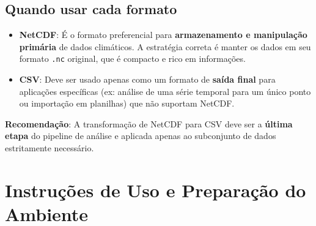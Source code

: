 \documentclass[12pt, a4paper]{article}
\begin{document}
\subsection*{Quando usar cada formato}
\begin{itemize}
    \item \textbf{NetCDF}: É o formato preferencial para \textbf{armazenamento e manipulação primária} de dados climáticos. A estratégia correta é manter os dados em seu formato \texttt{.nc} original, que é compacto e rico em informações.
    
    \item \textbf{CSV}: Deve ser usado apenas como um formato de \textbf{saída final} para aplicações específicas (ex: análise de uma série temporal para um único ponto ou importação em planilhas) que não suportam NetCDF.
\end{itemize}

\textbf{Recomendação}: A transformação de NetCDF para CSV deve ser a \textbf{última etapa} do pipeline de análise e aplicada apenas ao subconjunto de dados estritamente necessário.

\section{Instruções de Uso e Preparação do Ambiente}
\end{document}
